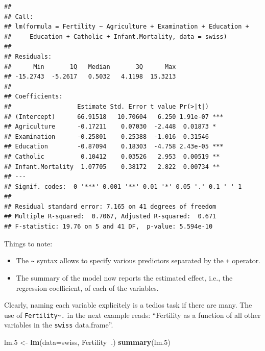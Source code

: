 \documentclass[]{book}
\newenvironment{Shaded}{\begin{snugshade}}{\end{snugshade}}
\newcommand{\KeywordTok}[1]{\textcolor[rgb]{0.13,0.29,0.53}{\textbf{#1}}}
\newcommand{\DataTypeTok}[1]{\textcolor[rgb]{0.13,0.29,0.53}{#1}}
\newcommand{\DecValTok}[1]{\textcolor[rgb]{0.00,0.00,0.81}{#1}}
\newcommand{\StringTok}[1]{\textcolor[rgb]{0.31,0.60,0.02}{#1}}
\newcommand{\OperatorTok}[1]{\textcolor[rgb]{0.81,0.36,0.00}{\textbf{#1}}}
\newcommand{\NormalTok}[1]{#1}
\providecommand{\tightlist}{%
  \setlength{\itemsep}{0pt}\setlength{\parskip}{0pt}}
\theoremstyle{definition}
\theoremstyle{definition}
\theoremstyle{definition}
\theoremstyle{remark}
\begin{document}
\begin{verbatim}
## 
## Call:
## lm(formula = Fertility ~ Agriculture + Examination + Education + 
##     Education + Catholic + Infant.Mortality, data = swiss)
## 
## Residuals:
##      Min       1Q   Median       3Q      Max 
## -15.2743  -5.2617   0.5032   4.1198  15.3213 
## 
## Coefficients:
##                  Estimate Std. Error t value Pr(>|t|)    
## (Intercept)      66.91518   10.70604   6.250 1.91e-07 ***
## Agriculture      -0.17211    0.07030  -2.448  0.01873 *  
## Examination      -0.25801    0.25388  -1.016  0.31546    
## Education        -0.87094    0.18303  -4.758 2.43e-05 ***
## Catholic          0.10412    0.03526   2.953  0.00519 ** 
## Infant.Mortality  1.07705    0.38172   2.822  0.00734 ** 
## ---
## Signif. codes:  0 '***' 0.001 '**' 0.01 '*' 0.05 '.' 0.1 ' ' 1
## 
## Residual standard error: 7.165 on 41 degrees of freedom
## Multiple R-squared:  0.7067, Adjusted R-squared:  0.671 
## F-statistic: 19.76 on 5 and 41 DF,  p-value: 5.594e-10
\end{verbatim}

Things to note:

\begin{itemize}
\tightlist
\item
  The \texttt{\textasciitilde{}} syntax allows to specify various
  predictors separated by the \texttt{+} operator.
\item
  The summary of the model now reports the estimated effect, i.e., the
  regression coefficient, of each of the variables.
\end{itemize}

Clearly, naming each variable explicitely is a tedios task if there are
many. The use of \texttt{Fertility\textasciitilde{}.} in the next
example reads: ``Fertility as a function of all other variables in the
\texttt{swiss} data.frame''.

\begin{Shaded}
\begin{Highlighting}[]
\NormalTok{lm.}\DecValTok{5}\NormalTok{ <-}\StringTok{ }\KeywordTok{lm}\NormalTok{(}\DataTypeTok{data=}\NormalTok{swiss, Fertility}\OperatorTok{~}\NormalTok{.)}
\KeywordTok{summary}\NormalTok{(lm.}\DecValTok{5}\NormalTok{)}
\end{Highlighting}
\end{Shaded}
\end{document}
